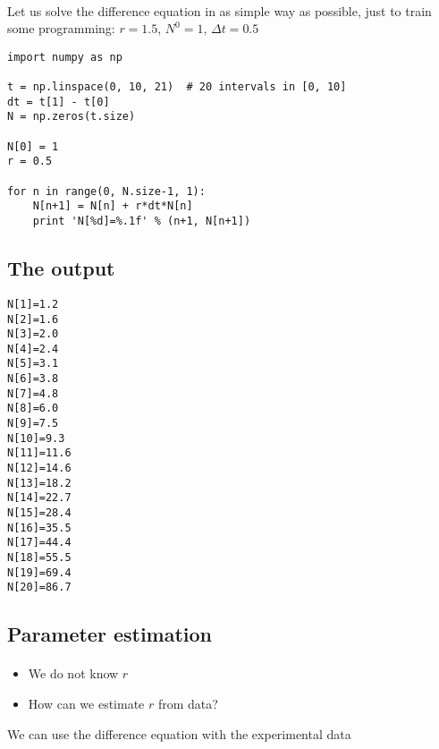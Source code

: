 \documentclass[%
twoside,                 %
final,                   %
10pt]{article}
\begin{document}
\paragraph{}
Let us solve the difference equation in as simple way as possible,
just to train some programming: $r=1.5$, $N^0=1$, $\Delta t=0.5$

\begin{verbatim}
import numpy as np

t = np.linspace(0, 10, 21)  # 20 intervals in [0, 10]
dt = t[1] - t[0]
N = np.zeros(t.size)

N[0] = 1
r = 0.5

for n in range(0, N.size-1, 1):
    N[n+1] = N[n] + r*dt*N[n]
    print 'N[%d]=%.1f' % (n+1, N[n+1])
\end{verbatim}



\subsection*{The output}

\begin{Verbatim}[numbers=none,fontsize=\fontsize{9pt}{9pt},baselinestretch=0.95]
N[1]=1.2
N[2]=1.6
N[3]=2.0
N[4]=2.4
N[5]=3.1
N[6]=3.8
N[7]=4.8
N[8]=6.0
N[9]=7.5
N[10]=9.3
N[11]=11.6
N[12]=14.6
N[13]=18.2
N[14]=22.7
N[15]=28.4
N[16]=35.5
N[17]=44.4
N[18]=55.5
N[19]=69.4
N[20]=86.7
\end{Verbatim}

\subsection*{Parameter estimation}


\paragraph{}
\begin{itemize}
 \item We do not know $r$

 \item How can we estimate $r$ from data?
\end{itemize}

\noindent
We can use the difference equation with the experimental data
\end{document}
